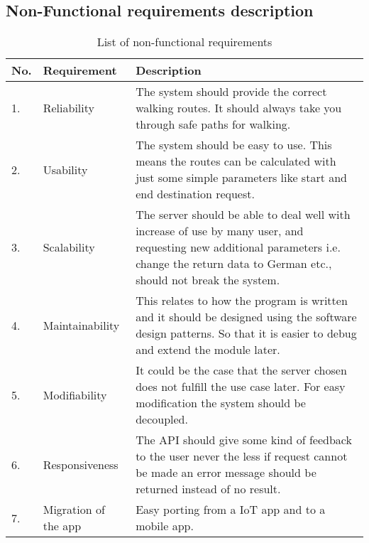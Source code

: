         \subsection{Non-Functional requirements description}
            \label{ssec:nonFuncList}
            \begin{table}[h!]
                \centering
                    \begin{tabular}{|p{0.5cm}||p{3cm}|p{11cm}|}
                        \hline
                            \textbf{No.} & \textbf{Requirement} & \textbf{Description} \\
                        \hline
                            1. &  Reliability & The system should provide the
                            correct walking routes. It should always take you through safe paths for 
                            walking.\\
                        \hline
                            2. & Usability & The system should be easy to use. This means the routes can be
                            calculated with just some simple parameters like start and end destination request.\\
                            
                        \hline
                            3. & Scalability & The server should be able to deal well with increase of use by many user,
                            and requesting new additional parameters i.e. change the return data to German etc., 
                            should not break the system.\\    
                        
                        \hline
                            4. & Maintainability & This relates to how the program is written and it 
                            should be designed using the software design patterns. So that it is easier to
                            debug and extend the module later.\\
                        \hline    
                            5. & Modifiability & It could be the case that the server chosen does not 
                            fulfill the use case later. For easy
                            modification the system should be decoupled.\\
                        \hline
                            6. & Responsiveness & The API should give some kind of feedback to the user
                            never the less if request cannot be made an error message should be
                            returned instead of no result.\\
                        \hline
                            7. & Migration of the app & Easy porting from a IoT \cite{IoT} app 
                            and to a mobile app.\\ 
                                 
                        \hline    
                    \end{tabular}    
                \caption{List of non-functional requirements}
                \label{table:nonfunctionalRequirements}
            \end{table}   
